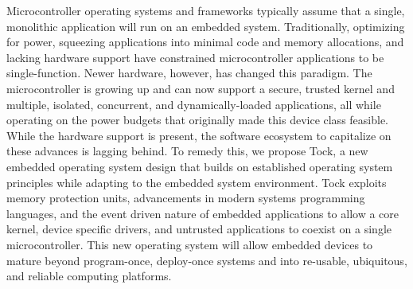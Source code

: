 

Microcontroller operating systems and frameworks typically assume that a single,
monolithic application will run on an embedded system.
Traditionally,
optimizing for power, squeezing applications into minimal code and memory
allocations, and lacking hardware support
have
constrained microcontroller applications to be single-function.
Newer hardware, however, has changed this paradigm.
The microcontroller is growing up and can now support
a secure, trusted kernel and
multiple, isolated, concurrent, and dynamically-loaded applications,
all while operating on the power budgets that originally made this device
class feasible.
While the hardware support is present, the software ecosystem to capitalize on these
advances is lagging behind. To remedy this, we propose Tock, a new embedded operating system design
that builds on established operating system
principles while adapting to the embedded system environment. Tock exploits
memory protection units, advancements in modern systems programming languages,
and the event driven nature of embedded applications to allow a core kernel,
device specific drivers, and untrusted applications to coexist on a single
microcontroller. This new operating system will allow embedded devices to
mature beyond program-once, deploy-once systems and into re-usable, ubiquitous,
and reliable computing platforms.





